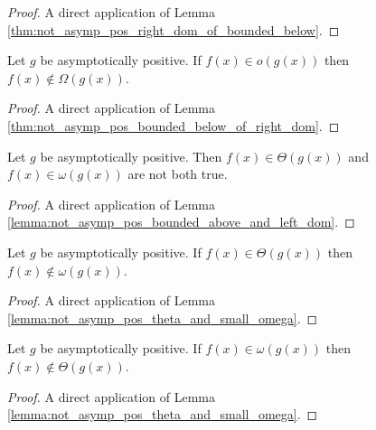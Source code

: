 \begin{proof}
    \leanok
    A direct application of Lemma \ref{thm:not_asymp_pos_right_dom_of_bounded_below}.
\end{proof}

\begin{lemma}
    \label{lemma:not_asymp_pos_big_omega_of_o}
    \leanok
    Let $g$ be asymptotically positive. If $f(x) \in o(g(x))$ then $f(x) \notin \Omega(g(x))$.
\end{lemma}

\begin{proof}
    \leanok
    A direct application of Lemma \ref{thm:not_asymp_pos_bounded_below_of_right_dom}.
\end{proof}

\begin{lemma}
    \label{lemma:not_asymp_pos_theta_and_small_omega}
    \leanok
    Let $g$ be asymptotically positive. Then $f(x) \in \Theta(g(x))$ and 
    $f(x) \in \omega(g(x))$ are not both true.
\end{lemma}

\begin{proof}
    \leanok
    A direct application of Lemma \ref{lemma:not_asymp_pos_bounded_above_and_left_dom}.
\end{proof}

\begin{lemma}
    \label{lemma:not_asymp_pos_small_omega_of_theta}
    \leanok
    Let $g$ be asymptotically positive. If $f(x) \in \Theta(g(x))$ then $f(x) \notin \omega(g(x))$.
\end{lemma}

\begin{proof}
    \leanok
    A direct application of Lemma \ref{lemma:not_asymp_pos_theta_and_small_omega}.
\end{proof}

\begin{lemma}
    \label{lemma:not_asymp_pos_theta_of_small_omega}
    \leanok
    Let $g$ be asymptotically positive. If $f(x) \in \omega(g(x))$ then $f(x) \notin \Theta(g(x))$.
\end{lemma}

\begin{proof}
    \leanok
    A direct application of Lemma \ref{lemma:not_asymp_pos_theta_and_small_omega}.
\end{proof}


